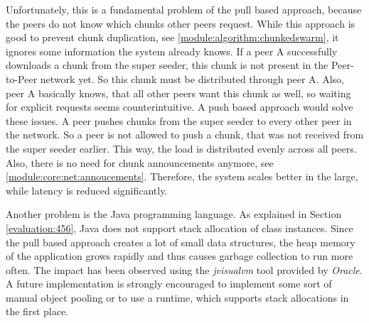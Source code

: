 Unfortunately, this is a fundamental problem of the pull based approach, because the peers do not know which chunks other peers request. While this approach is good to prevent chunk duplication, see \ref{module:algorithm:chunkedswarm}, it ignores some information the system already knows. If a peer A successfully downloads a chunk from the super seeder, this chunk is not present in the Peer-to-Peer network yet. So this chunk must be distributed through peer A. Also, peer A basically knows, that all other peers want this chunk as well, so waiting for explicit requests seems counterintuitive. A push based approach would solve these issues. A peer pushes chunks from the super seeder to every other peer in the network. So a peer is not allowed to push a chunk, that was not received from the super seeder earlier. This way, the load is distributed evenly across all peers. Also, there is no need for chunk announcements anymore, see \ref{module:core:net:annoucements}. Therefore, the system scales better in the large, while latency is reduced significantly.

Another problem is the Java programming language. As explained in Section \ref{evaluation:456}, Java does not support stack allocation of class instances. Since the pull based approach creates a lot of small data structures, the heap memory of the application grows rapidly and thus causes garbage collection to run more often. The impact has been observed using the \emph{jvisualvm} tool provided by \emph{Oracle}. A future implementation is strongly encouraged to implement some sort of manual object pooling or to use a runtime, which supports stack allocations in the first place.